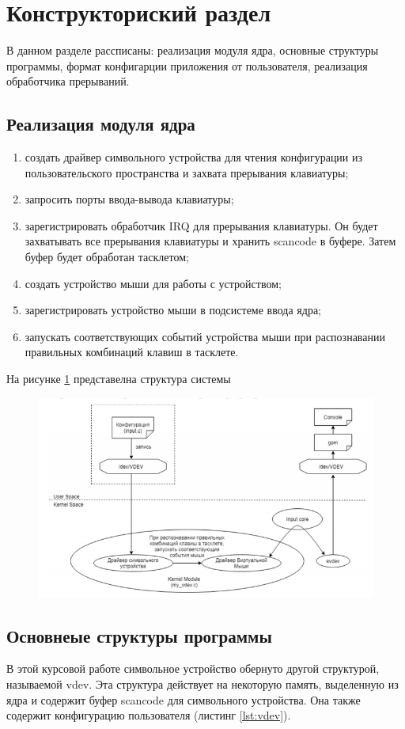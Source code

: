 \newpage
\section{Конструкториский раздел}
В данном разделе рассписаны: реализация модуля ядра, основные структуры программы, формат конфигарции приложения от пользователя, реализация обработчика прерываний.
\subsection{Реализация модуля ядра}
\begin{enumerate}
	\item создать драйвер символьного устройства для чтения конфигурации из пользовательского пространства и захвата прерывания клавиатуры;
	\item запросить порты ввода-вывода клавиатуры;
	\item зарегистрировать обработчик IRQ для прерывания клавиатуры. 
	Он будет захватывать все прерывания клавиатуры и хранить scancode в буфере.
	Затем буфер будет обработан тасклетом;
	\item создать устройство мыши для работы с устройством;
	\item зарегистрировать устройство мыши в подсистеме ввода ядра;
	\item запускать соответствующих событий устройства мыши при распознавании правильных комбинаций клавиш в тасклете. 
\end{enumerate}

На рисунке \ref{fig:moduleschema} представелна структура системы
\begin{figure}[H]
	\centering
	\includegraphics[width=0.7\linewidth]{src/img/module_schema}
	\caption{}
	\label{fig:moduleschema}
\end{figure}

\subsection{Основнеые структуры программы}
В этой курсовой работе символьное устройство обернуто другой структурой, называемой vdev. 
Эта структура действует на некоторую память, выделенную из ядра и содержит буфер scancode для символьного устройства. 
Она также содержит конфигурацию пользователя (листинг \ref{lst:vdev}).

